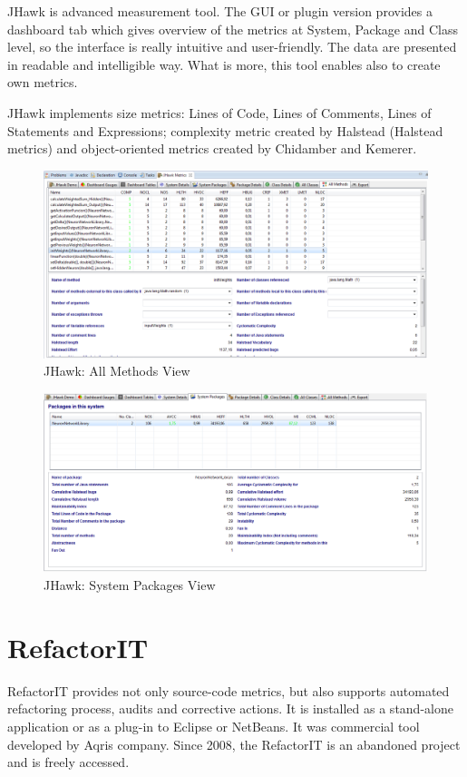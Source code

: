 JHawk is advanced measurement tool. The GUI or plugin version provides a dashboard tab which gives overview of the metrics at System, Package and Class level, so the interface is really intuitive and user-friendly. The data are presented in readable and intelligible way. What is more, this tool enables also to create own metrics.

JHawk implements size metrics: Lines of Code, Lines of Comments, Lines of Statements and Expressions; complexity metric created by Halstead (Halstead metrics) and object-oriented metrics created by Chidamber and Kemerer. 

\begin{figure}[h!]
	\centering
	\includegraphics[scale=0.45]{img/jhawk1.png} 
	\caption{JHawk: All Methods View}		
	\label{fig:jhawk1}
\end{figure}

\begin{figure}[h!]
	\centering
	\includegraphics[scale=0.45]{img/jhawk2.png}  
	\caption{JHawk: System Packages View}		
	\label{fig:jhawk2}
\end{figure}

\section{RefactorIT}
RefactorIT provides not only source-code metrics, but also supports automated refactoring process, audits and corrective actions. It is installed as a stand-alone application or as a plug-in to Eclipse or NetBeans. It was commercial tool developed by Aqris company. Since 2008, the RefactorIT is an abandoned project and is freely accessed.  

